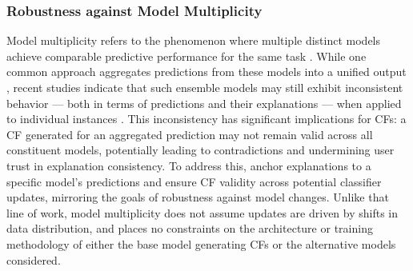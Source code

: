 \subsubsection{Robustness against Model Multiplicity}
Model multiplicity refers to the phenomenon where multiple distinct models achieve comparable predictive performance for the same task \cite{breiman2001statistical,Marx2020Predictive}. 
While one common approach aggregates predictions from these models into a unified output \cite{Black2022Selective}, recent studies indicate that such ensemble models may still exhibit inconsistent behavior — both in terms of predictions and their explanations — when applied to individual instances \cite{Rudin2019Stop,coston2021characterizing}. This inconsistency has significant implications for CFs: a CF generated for an aggregated prediction may not remain valid across all constituent models, potentially leading to contradictions and undermining user trust in explanation consistency. To address this, \cite{pawelczyk2020counterfactual} anchor explanations to a specific model's predictions and ensure CF validity across potential classifier updates, mirroring the goals of robustness against model changes. Unlike that line of work, model multiplicity does not assume updates are driven by shifts in data distribution, and places no constraints on the architecture or training methodology of either the base model generating CFs or the alternative models considered.
